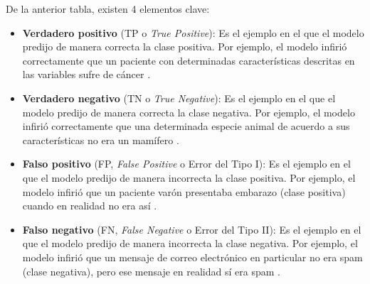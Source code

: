 De la anterior tabla, existen 4 elementos clave:
\begin{itemize}
	\item \textbf{Verdadero positivo} (TP o \textit{True Positive}): Es el ejemplo en el que el modelo predijo de manera correcta la clase positiva. Por ejemplo, el modelo infirió correctamente que un paciente con determinadas características descritas en las variables sufre de cáncer \parencite{gl_google2018machinelearning}.
	\item \textbf{Verdadero negativo} (TN o \textit{True Negative}): Es el ejemplo en el que el modelo predijo de manera correcta la clase negativa. Por ejemplo, el modelo infirió correctamente que una determinada especie animal de acuerdo a sus características no era un mamífero \parencite{gl_google2018machinelearning}.
	\item \textbf{Falso positivo} (FP, \textit{False Positive} o Error del Tipo I): Es el ejemplo en el que el modelo predijo de manera incorrecta la clase positiva. Por ejemplo, el modelo infirió que un paciente varón presentaba embarazo (clase positiva) cuando en realidad no era así \parencite{gl_google2018machinelearning}.
	\item \textbf{Falso negativo} (FN, \textit{False Negative} o Error del Tipo II): Es el ejemplo en el que el modelo predijo de manera incorrecta la clase negativa. Por ejemplo, el modelo infirió que un mensaje de correo electrónico en particular no era spam (clase negativa), pero ese mensaje en realidad sí era spam \parencite{gl_google2018machinelearning}. 
\end{itemize}


